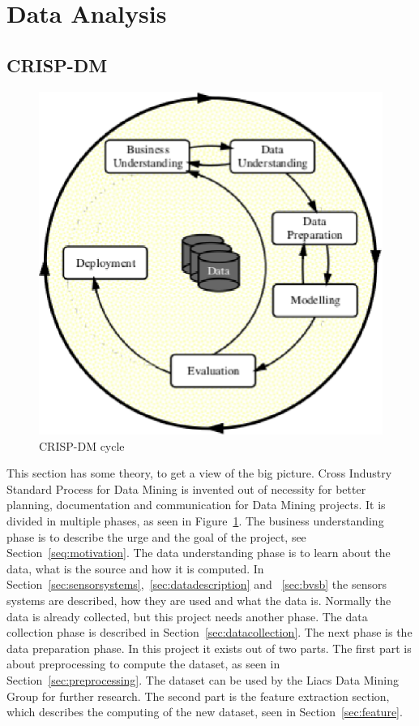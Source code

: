 \section{Data Analysis}
	\subsection{CRISP-DM}
	\label{sec:datamodeling}
	\begin{figure}[h]
		\centering
		\includegraphics[scale=0.75]{crispdm.eps}
					
		\caption{CRISP-DM \cite{wirth2000crisp} cycle}
		\label{fig:crispdm}

	\end{figure}
	This section has some theory, to get a view of the big picture. Cross Industry Standard Process for Data Mining \cite{wirth2000crisp} is invented out of necessity for better planning, documentation and communication for Data Mining projects. It is divided in multiple phases, as seen in Figure~\ref{fig:crispdm}. The business understanding phase is to describe the urge and the goal of the project, see Section~\ref{seq:motivation}. The data understanding phase is to learn about the data, what is the source and how it is computed. In Section~\ref{sec:sensorsystems},~\ref{sec:datadescription} and ~\ref{sec:bvsb} the sensors systems are described, how they are used and what the data is. Normally the data is already collected, but this project needs another phase. The data collection phase is described in Section~\ref{sec:datacollection}. The next phase is the data preparation phase. In this project it exists out of two parts. The first part is about preprocessing to compute the dataset, as seen in Section~\ref{sec:preprocessing}. The dataset can be used by the Liacs Data Mining Group for further research. The second part is the feature extraction section, which describes the computing of the new dataset, seen in Section~\ref{sec:feature}. 
